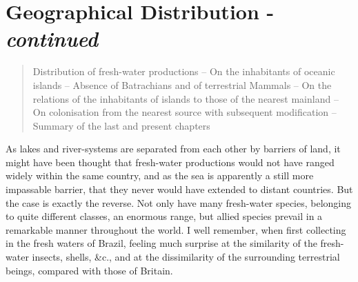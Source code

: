 \chapter{Geographical Distribution - \emph{continued}}

\begin{quotation}
Distribution of fresh-water productions -- On the inhabitants of oceanic islands -- Absence of Batrachians and of terrestrial Mammals -- On the relations of the inhabitants of islands to those of the nearest mainland -- On colonisation from the nearest source with subsequent modification -- Summary of the last and present chapters
\end{quotation}

\indent As lakes and river-systems are separated from each other by barriers of land, it might have been thought that fresh-water productions would not have ranged widely within the same country, and as the sea is apparently a still more impassable barrier, that they never would have extended to distant countries. But the case is exactly the reverse. Not only have many fresh-water species, belonging to quite different classes, an enormous range, but allied species prevail in a remarkable manner throughout the world. I well remember, when first collecting in the fresh waters of Brazil, feeling much surprise at the similarity of the fresh-water insects, shells, \&c., and at the dissimilarity of the surrounding terrestrial beings, compared with those of Britain.~\\
